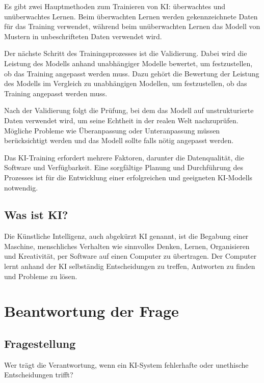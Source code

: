 \documentclass{report}
\begin{document}
    Es gibt zwei Hauptmethoden zum Trainieren von KI: überwachtes und unüberwachtes Lernen.
    Beim überwachten Lernen werden gekennzeichnete Daten für das Training verwendet, während beim unüberwachten Lernen das Modell von Mustern in unbeschrifteten Daten verwendet wird.
    
    Der nächste Schritt des Trainingsprozesses ist die Validierung. Dabei wird die Leistung des Modells anhand unabhängiger Modelle bewertet, um festzustellen, ob das Training angepasst werden muss.
    Dazu gehört die Bewertung der Leistung des Modells im Vergleich zu unabhängigen Modellen, um festzustellen, ob das Training angepasst werden muss. 

    Nach der Validierung folgt die Prüfung, bei dem das Modell auf unstrukturierte Daten verwendet wird, um seine Echtheit in der realen Welt nachzuprüfen.
    Mögliche Probleme wie Überanpassung oder Unteranpassung müssen berücksichtigt werden und das Modell sollte falls nötig angepasst werden.

    Das KI-Training erfordert mehrere Faktoren, darunter die Datenqualität, die Software und Verfügbarkeit.
    Eine sorgfältige Planung und Durchführung des Prozesses ist für die Entwicklung einer erfolgreichen und geeigneten KI-Modells notwendig.

    \section {Was ist KI?}
    Die Künstliche Intelligenz, auch abgekürzt KI genannt, ist die Begabung einer Maschine, menschliches Verhalten wie sinnvolles Denken, Lernen, Organisieren und Kreativität, per Software auf einen Computer zu übertragen. Der Computer lernt anhand der KI selbständig Entscheidungen zu treffen, Antworten zu finden und Probleme zu lösen.

\chapter{Beantwortung der Frage}

\section {Fragestellung}
Wer trägt die Verantwortung, wenn ein KI-System fehlerhafte oder unethische Entscheidungen trifft?
\end{document}
